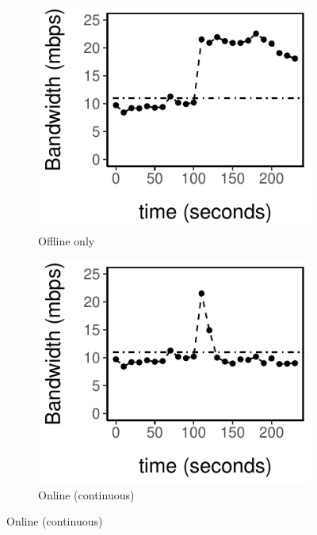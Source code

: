 \begin{figure}
  \centering
  \begin{subfigure}[t]{0.48\columnwidth}
    \centering
    \includegraphics[width=\textwidth]{figures/online1.pdf}
    \caption{Offline only}
    \label{fig:offline}
  \end{subfigure}
  \hfill
  \begin{subfigure}[t]{0.48\columnwidth}
    \centering
    \includegraphics[width=\textwidth]{figures/online2.pdf}
    \caption{Online (continuous)}
    \label{fig:online}
  \end{subfigure}

\end{figure}
